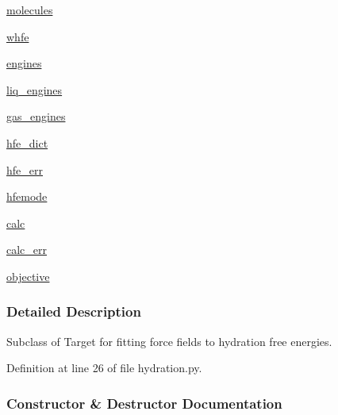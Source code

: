 \begin{DoxyCompactItemize}
\item 
\hyperlink{classsrc_1_1hydration_1_1Hydration_ab0f66321c4a27282ea77585d41690938}{molecules}
\item 
\hyperlink{classsrc_1_1hydration_1_1Hydration_ab5c9e3135020a9cfbb6e40932d52d939}{whfe}
\item 
\hyperlink{classsrc_1_1hydration_1_1Hydration_a161aab5e098f13ac8006ea8415814580}{engines}
\item 
\hyperlink{classsrc_1_1hydration_1_1Hydration_a1efd13384f5ae61c3d124b4a60919f20}{liq\+\_\+engines}
\item 
\hyperlink{classsrc_1_1hydration_1_1Hydration_a55f0671efcada5ea131aff966f43b5df}{gas\+\_\+engines}
\item 
\hyperlink{classsrc_1_1hydration_1_1Hydration_afe9e88569404d2b0b336cd5d4556e735}{hfe\+\_\+dict}
\item 
\hyperlink{classsrc_1_1hydration_1_1Hydration_a0ba698316e9f13844f33a2d536e96fa5}{hfe\+\_\+err}
\item 
\hyperlink{classsrc_1_1hydration_1_1Hydration_a5059eb3df02b9115866760fbc77927bc}{hfemode}
\item 
\hyperlink{classsrc_1_1hydration_1_1Hydration_a094fd3625680a572a4de38011818eefb}{calc}
\item 
\hyperlink{classsrc_1_1hydration_1_1Hydration_a3e5f36ed28f145dc611c3b156942c144}{calc\+\_\+err}
\item 
\hyperlink{classsrc_1_1hydration_1_1Hydration_a30d497d5cfd6b84611b5a4dbfe702ef8}{objective}
\end{DoxyCompactItemize}


\subsubsection{Detailed Description}
Subclass of Target for fitting force fields to hydration free energies. 



Definition at line 26 of file hydration.\+py.



\subsubsection{Constructor \& Destructor Documentation}
\mbox{\label{classsrc_1_1hydration_1_1Hydration_a367023ded700f1b67e3b26d3869c6c7b}} 
